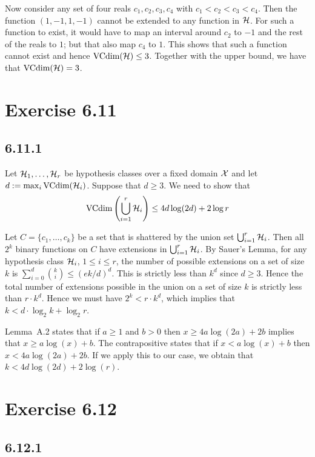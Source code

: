 Now consider any set of four reals $c_1, c_2, c_3, c_4$ with $c_1 < c_2 < c_3 <
c_4$.  Then the function $(1, -1, 1, -1)$ cannot be extended to any function in
$\mathcal{H}$.  For such a function to exist, it would have to map an interval
around $c_2$ to $-1$ and the rest of the reals to $1$; but that also map $c_4$
to $1$. This shows that such a function cannot exist and hence 
$\text{VCdim} (\mathcal{H}) \leq 3$. Together with the upper bound, we have 
that $\text{VCdim}(\mathcal{H}) = 3$.  

\section*{Exercise 6.11}

\subsection*{6.11.1} 

Let $\mathcal{H}_1, \ldots, \mathcal{H}_r$ be hypothesis classes over a fixed domain
$\mathcal{X}$ and let $d := \max_{i} \text{VCdim} (\mathcal{H}_i )$. Suppose that $d \geq 3$. We need 
to show that 
\[
    \text{VCdim} \left (\bigcup_{i = 1}^{r} \mathcal{H}_i \right ) \leq 4d \log (2d) + 2 \log r
\]

Let $C = \{c_1, \ldots, c_k\}$ be a set that is shattered by the union set 
$\bigcup_{i = 1}^r \mathcal{H}_i$. Then all $2^k$ binary functions on $C$ have 
extensions in $\bigcup_{i = 1}^r \mathcal{H}_i$. By Sauer's Lemma, for any 
hypothesis class $\mathcal{H}_i$, $1 \leq i \leq r$, the number of possible 
extensions on a set of size $k$ is $\sum_{i = 0}^d {k \choose i } \leq (e k/d)^d$. 
This is strictly less than $k^d$ since $d \geq 3$. Hence the total number of extensions 
possible in the union on a set of size $k$ is strictly less than $r \cdot k^d$. Hence we must
have $2^k < r \cdot k^d$, which implies that 
$k < d \cdot \log_2 k + \log_2 r$.

Lemma~A.2 states that if $a \geq 1$ and $b > 0$ then $x \geq 4a \log (2a) + 2b$
implies that $x \geq a \log (x) + b$. The contrapositive states that if 
$x < a \log (x) + b$ then $x < 4a \log (2a) + 2b$. If we apply this to our case, 
we obtain that $k < 4d \log (2d) + 2 \log (r)$.

\section*{Exercise 6.12}

\subsection*{6.12.1}

